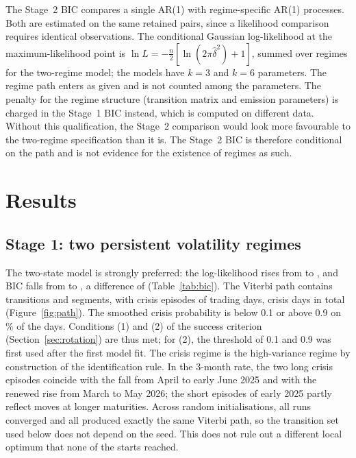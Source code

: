 \documentclass[11pt,a4paper]{article}
\begin{document}
The Stage~2 BIC compares a single AR(1) with regime-specific AR(1) processes. Both are estimated on the same \NPairsKept{} retained pairs, since a likelihood comparison requires identical observations. The conditional Gaussian log-likelihood at the maximum-likelihood point is $\ln L=-\tfrac{n}{2}\left[\ln(2\pi\hat\delta^2)+1\right]$, summed over regimes for the two-regime model; the models have $k=3$ and $k=6$ parameters. The regime path enters as given and is not counted among the parameters. The penalty for the regime structure (transition matrix and emission parameters) is charged in the Stage~1 BIC instead, which is computed on different data. Without this qualification, the Stage~2 comparison would look more favourable to the two-regime specification than it is. The Stage~2 BIC is therefore conditional on the path and is not evidence for the existence of regimes as such.

\section{Results}\label{sec:results}

\subsection{Stage 1: two persistent volatility regimes}

The two-state model is strongly preferred: the log-likelihood rises from \LLone{} to \LLtwo{}, and BIC falls from \BICone{} to \BICtwo{}, a difference of \DBICone{} (Table~\ref{tab:bic}). The Viterbi path contains \NSwitch{} transitions and \NSeg{} segments, with \NCrisisEp{} crisis episodes of \CrisisEpLengths{} trading days, \NCrisisDays{} crisis days in total (Figure~\ref{fig:path}). The smoothed crisis probability is below 0.1 or above 0.9 on \Decisive\% of the days. Conditions (1) and (2) of the success criterion (Section~\ref{sec:rotation}) are thus met; for (2), the threshold of 0.1 and 0.9 was first used after the first model fit. The crisis regime is the high-variance regime by construction of the identification rule. In the 3-month rate, the two long crisis episodes coincide with the fall from April to early June 2025 and with the renewed rise from March to May 2026; the short episodes of early 2025 partly reflect moves at longer maturities. Across \NStarts{} random initialisations, all runs converged and all \NStartsSame{} produced exactly the same Viterbi path, so the transition set used below does not depend on the seed. This does not rule out a different local optimum that none of the starts reached.
\end{document}
